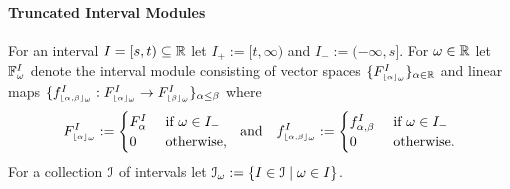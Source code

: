 \paragraph*{Truncated Interval Modules}

For an interval $I = [s,t)\subseteq \mathbb{R}$ let $I_+ := [t,\infty)$ and $I_- := (-\infty, s]$.
For $\omega\in\mathbb{R}$ let $\mathbb{F}_{\omega}^I$ denote the interval module consisting of vector spaces $\{F_{\scriptscriptstyle \lfloor\alpha\rfloor_{\omega}}^I\}_{\alpha\in\mathbb{R}}$ and linear maps $\{f_{\scriptscriptstyle \lfloor\alpha,\beta\rfloor_{\omega}}^I : F_{\scriptscriptstyle \lfloor\alpha\rfloor_{\omega}}^I\to F_{\scriptscriptstyle \lfloor\beta\rfloor_{\omega}}^I\}_{\alpha\leq\beta}$ where
\[ F_{\scriptscriptstyle \lfloor\alpha\rfloor_{\omega}}^I := \begin{cases} F_\alpha^I&\text{ if } \omega\in I_-\\ 0&\text{ otherwise,}\end{cases}\ \text{ and }\ \ f_{\scriptscriptstyle \lfloor\alpha,\beta\rfloor_{\omega}}^I := \begin{cases} f_{\alpha,\beta}^I&\text{ if } \omega\in I_-\\ 0&\text{ otherwise.}\end{cases}\]
For a collection $\mathcal{I}$ of intervals let $\mathcal{I}_\omega := \{I\in\mathcal{I}\mid \omega\in I\}$.


%

